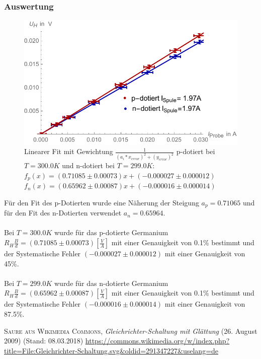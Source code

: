 \subsubsection{Auswertung}
\begin{figure}[H]
	\centering
\includegraphics[width=0.9\linewidth]{IMAGE/M31_Fit.pdf}
	\caption{Linearer Fit mit Gewichtung $\frac{1}{(a_{i}*x_{error})^2+(y_{error})^2}$ p-dotiert bei $T=300.0K$ und n-dotiert bei $T=299.0K$:\\ $f_{p}(x)=(0.71085 \pm 0.00073)x + (-0.000027 \pm 0.000012)$\\ $f_{n}(x)=(0.65962 \pm 0.00087)x + (-0.000016 \pm 0.000014)$}
	\label{fig:M3_1_1}
\end{figure} 


Für den Fit  des p-Dotierten wurde eine Näherung der Steigung  $a_{p}=0.71065$  und für den Fit des n-Dotierten verwendet $a_{n}=0.65964$.\\
\\
Bei $T=300.0K$ wurde für das p-dotierte Germanium  $R_{H}\frac{B}{d}=(0.71085 \pm 0.00073) [\frac{V}{A}]$ mit einer Genauigkeit von 0.1\% bestimmt und\\
der Systematische Fehler $(-0.000027 \pm 0.000012)$ mit einer Genauigkeit von 45\%.\\
\\
Bei $T=299.0K$ wurde für das n-dotierte Germanium $R_{H}\frac{B}{d}=(0.65962 \pm 0.00087) [\frac{V}{A}]$ mit einer Genauigkeit von 0.1\% bestimmt und\\ der Systematische Fehler $(-0.000016 \pm 0.000014)$ mit einer Genauigkeit von 87.5\%.\\


\listoffigures
\listoftables

\begin{thebibliography}{99}
	 \textsc{Saure aus Wikimedia Commons}, \emph{Gleichrichter-Schaltung mit Glättung} (26. August 2009) (Stand: 08.03.2018) \url{https://commons.wikimedia.org/w/index.php?title=File:Gleichrichter-Schaltung.svg&oldid=291347227&uselang=de}
\end{thebibliography}


